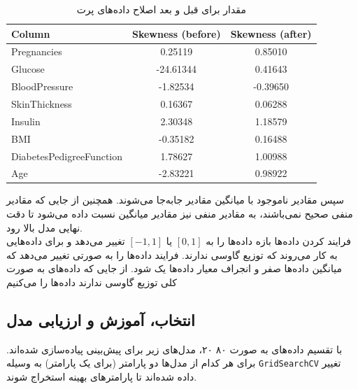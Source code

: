 \documentclass[11pt]{article}
\begin{document}
	\begin{table}[h!]
		\centering
		\caption{مقدار  برای قبل و بعد اصلاح داده‌های پرت}
		\begin{latin}
			{\scriptsize
				\begin{tabular}{lcc}
					\toprule
					Column                     & Skewness (before) & Skewness (after)     \\ 
					\midrule
					Pregnancies                & 0.25119            & 0.85010  \\ 
					Glucose                    & -24.61344            & 0.41643  \\ 
					BloodPressure              & -1.82534             & -0.39650  \\ 
					SkinThickness              & 0.16367            & 0.06288  \\ 
					Insulin                    & 2.30348             & 1.18579  \\ 
					BMI                        & -0.35182             & 0.16488  \\ 
					DiabetesPedigreeFunction   & 1.78627            & 1.00988  \\ 
					Age                        & -2.83221            & 0.98922  \\
					\bottomrule
				\end{tabular}
			}
		\end{latin}
		\label{tab:skewness}
	\end{table}
	سپس مقادیر ناموجود با میانگین مقادیر جابه‌جا می‌شوند. همچنین از جایی که مقادیر منفی صحیح نمی‌باشند، به مقادیر منفی نیز مقادیر میانگین نسبت داده می‌شود تا دقت نهایی مدل بالا رود.\\
	فرایند 
	کردن داده‌ها بازه داده‌ها را به $[0,1]$ یا $[-1,1]$ تغییر می‌دهد و برای داده‌هایی به کار می‌روند که توزیع گاوسی ندارند. فرایند 
	داده‌ها را به صورتی تغییر می‌دهد که میانگین داده‌ها صفر و انجراف معیار داده‌ها یک شود. از جایی که داده‌های به صورت کلی توزیع گاوسی ندارند داده‌ها را
	می‌کنیم
	\clearpage
	\subsection{انتخاب، آموزش و ارزیابی مدل}
	با تقسیم داده‌های به صورت ۸۰ ۲۰، مدل‌های زیر برای پیش‌بینی پیاده‌سازی شده‌اند. برای هر کدام از مدل‌ها دو پارامتر (برای  یک پارامتر) به وسیله 
	\verb|GridSearchCV|
	تغییر داده شده‌اند تا پارامتر‌های بهینه استخراج شوند.
\end{document}
